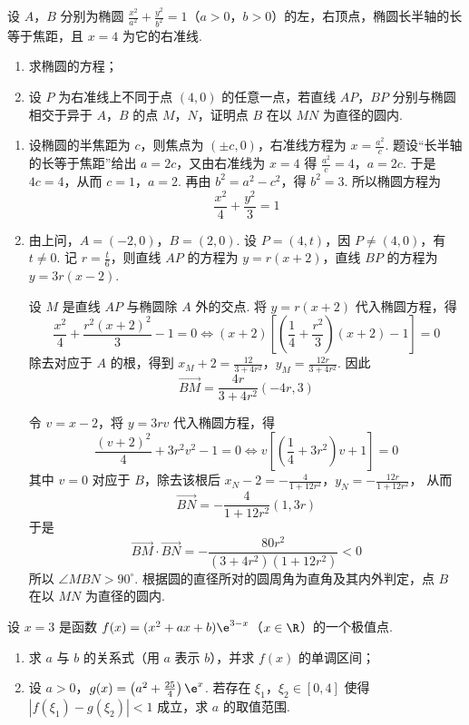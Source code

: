 \begin{problem}
设 \(A\)，\(B\) 分别为椭圆 \(\frac{x^2}{a^2} + \frac{y^2}{b^2} = 1\)（\(a > 0\)，\(b > 0\)）的左，右顶点，椭圆长半轴的长等于焦距，且 \(x = 4\) 为它的右准线.

\begin{enumerate}
\item 求椭圆的方程；
\item 设 \(P\) 为右准线上不同于点 \((4,0)\) 的任意一点，若直线 \(AP\)，\(BP\) 分别与椭圆相交于异于 \(A\)，\(B\) 的点 \(M\)，\(N\)，证明点 \(B\) 在以 \(MN\) 为直径的圆内.
\end{enumerate}
\end{problem}

\begin{solution}
\begin{enumerate}
\item
设椭圆的半焦距为 \(c\)，则焦点为 \((\pm c,0)\)，右准线方程为 \(x=\frac{a^{2}}{c}\). 题设“长半轴的长等于焦距”给出 \(a=2c\)，又由右准线为 \(x=4\) 得
\(\frac{a^{2}}{c}=4\)，\(a=2c\).
于是 \(4c=4\)，从而 \(c=1\)，\(a=2\). 再由 \(b^{2}=a^{2}-c^{2}\)，得 \(b^{2}=3\). 所以椭圆方程为
\[
\frac{x^{2}}{4}+\frac{y^{2}}{3}=1
\]

\item
由上问，\(A=(-2,0)\)，\(B=(2,0)\). 设 \(P=(4,t)\)，因 \(P\ne(4,0)\)，有 \(t\ne0\). 记 \(r=\frac{t}{6}\)，则直线 \(AP\) 的方程为 \(y=r(x+2)\)，直线 \(BP\) 的方程为 \(y=3r(x-2)\).

设 \(M\) 是直线 \(AP\) 与椭圆除 \(A\) 外的交点. 将 \(y=r(x+2)\) 代入椭圆方程，得
\[
\frac{x^{2}}{4}+\frac{r^{2}(x+2)^{2}}{3}-1=0
\Longleftrightarrow
(x+2)\left[\left(\frac14+\frac{r^{2}}{3}\right)(x+2)-1\right]=0
\]
除去对应于 \(A\) 的根，得到
\(x_M+2=\frac{12}{3+4r^{2}}\)，\(y_M=\frac{12r}{3+4r^{2}}\).
因此
\[
\overrightarrow{BM}=\frac{4r}{3+4r^{2}}(-4r,3)
\]

令 \(v=x-2\)，将 \(y=3rv\) 代入椭圆方程，得
\[
\frac{(v+2)^{2}}{4}+3r^{2}v^{2}-1=0
\Longleftrightarrow
v\left[\left(\frac14+3r^{2}\right)v+1\right]=0
\]
其中 \(v=0\) 对应于 \(B\)，除去该根后
\(x_N-2=-\frac{4}{1+12r^{2}}\)，\(y_N=-\frac{12r}{1+12r^{2}}\)，
从而
\[
\overrightarrow{BN}=-\frac{4}{1+12r^{2}}(1,3r)
\]
于是
\[
\overrightarrow{BM}\cdot\overrightarrow{BN}=-\frac{80r^{2}}{(3+4r^{2})(1+12r^{2})}<0
\]
所以 \(\angle MBN>90^{\circ}\). 根据圆的直径所对的圆周角为直角及其内外判定，点 \(B\) 在以 \(MN\) 为直径的圆内.
\end{enumerate}
\end{solution}

\begin{problem}
设 \(x = 3\) 是函数 \(f(x) = (x^2 + ax + b)\e^{3 - x}\)（\(x \in \R\)）的一个极值点.

\begin{enumerate}
\item 求 \(a\) 与 \(b\) 的关系式（用 \(a\) 表示 \(b\)），并求 \(f(x)\) 的单调区间；
\item 设 \(a > 0\)，\(g(x) = \left(a^2 + \frac{25}{4}\right)\e^x\). 若存在 \(\xi_1\)，\(\xi_2 \in [0,4]\) 使得 \(\left|f(\xi_1) - g(\xi_2)\right| < 1\) 成立，求 \(a\) 的取值范围.
\end{enumerate}
\end{problem}

